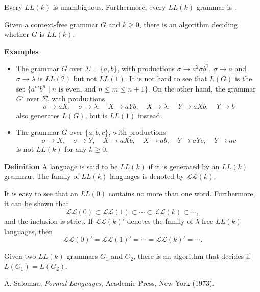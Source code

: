 \documentclass[12pt]{article}
\begin{document}
Every $LL(k)$ is unambiguous.  Furthermore, every $LL(k)$ grammar is .

Given a context-free grammar $G$ and $k\ge 0$, there is an algorithm deciding whether $G$ is $LL(k)$.

\textbf{Examples}  
\begin{itemize}
\item 
The grammar $G$ over $\Sigma=\lbrace a,b\rbrace$, with productions $\sigma \to a^2 \sigma b^2$, $\sigma \to a$ and $\sigma \to \lambda$ is $LL(2)$ but not $LL(1)$.  It is not hard to see that $L(G)$ is the set $\lbrace a^m b^n \mid n\mbox{ is even, and }n\le m\le n+1\rbrace$.  On the other hand, the grammar $G'$ over $\Sigma$, with productions $$\sigma \to aX, \quad \sigma\to \lambda,\quad X\to aYb,\quad X\to \lambda,\quad Y\to aXb, \quad Y\to b$$ also generates $L(G)$, but is $LL(1)$ instead.
\item
The grammar $G$ over $\lbrace a,b,c\rbrace$, with productions $$\sigma\to X,\quad \sigma\to Y,\quad X\to aXb,\quad X\to ab, \quad Y\to aYc, \quad Y\to ac$$ is not $LL(k)$ for any $k\ge 0$.
\end{itemize}

\textbf{Definition} A language is said to be $LL(k)$ if it is generated by an $LL(k)$ grammar.  The family of $LL(k)$ languages is denoted by $\mathscr{LL}(k)$.

It is easy to see that an $LL(0)$ contains no more than one word.  Furthermore, it can be shown that 
$$\mathscr{LL}(0)\subset \mathscr{LL}(1)\subset \cdots \subset \mathscr{LL}(k) \subset \cdots ,$$ and the inclusion is strict.  If $\mathscr{LL}(k)'$ denotes the family of $\lambda$-free $LL(k)$ languages, then 
$$\mathscr{LL}(0)'= \mathscr{LL}(1)'= \cdots = \mathscr{LL}(k)' = \cdots .$$

Given two $LL(k)$ grammars $G_1$ and $G_2$, there is an algorithm that decides if $L(G_1)=L(G_2)$.

\begin{thebibliography}{9}
 A. Salomaa, {\em Formal Languages}, Academic Press, New York (1973).
\end{thebibliography}

\end{document}

